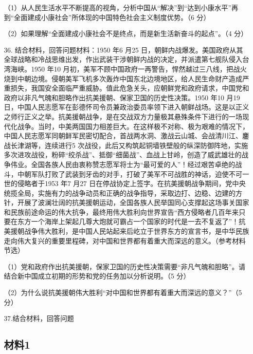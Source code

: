 \documentclass[UTF8,11pt]{ctexart}
\begin{document}
（1）从人民生活水平不断提高的视角，分析中国从“解决”到“达到小康水平”再到“全面建成小康社会”所体现的中国特色社会主义制度优势。（6 分）


（2）如果理解“全面建成小康社会不是终点，而是新生活新奋斗的起点”。（4 分）


36. 结合材料，回答问题材料：1950 年6 月25 日，朝鲜内战爆发。美国政府从其全球战略和冷战思维出发，作出武装干涉朝鲜内战的决定，并派遣第七舰队侵入台湾海峡。1950 年10 月初，美军不顾中国政府一再警告，悍然越过三八线，把战火烧到中朝边境。侵朝美军飞机多次轰炸中国东北边境地区，给人民生命财产造成严重损失，我国安全面临严重威胁。值此危急关头，应朝鲜党和政府请求，中国党和政府以非凡气魄和胆略作出抗美援朝、保家卫国的历史性决策。1950 年10 月19 日，中国人民志愿军在彭德怀司令员兼政治委员率领下进入朝鲜战场。这是以正义之师行正义之举。抗美援朝战争，是在交战双方力量极其悬殊条件下进行的一场现代化战争。当时，中美两国国力相差巨大。在这样极不对称、极为艰难的情况下，中国人民志愿军同朝鲜军民密切配合，首战两水洞、激战云山城、会战清川江、鏖战长津湖等，连续进行5 次战役，此后又构筑起铜墙铁壁般的纵深防御阵地，实施多次进攻战役，粉碎“绞杀战”、抵御“细菌战”、血战上甘岭，创造了威武雄壮的战争伟业。全国各族人民由衷称赞志愿军将士为“最可爱的人”！经过艰苦卓绝的战斗，中朝军队打败了武装到牙齿的对手，打破了美军不可战胜的神话，迫使不可一世的侵略者于1953 年7 月27 日在停战协定上签字。在抗美援朝战争期间，党中央统揽全局，实施有力的战争动员和正确的战争指导，采取边打、边稳、边建的方针，开展了波澜壮阔的抗美援朝运动，全国各族人民举国同心支撑起这场事关国家和民族前途命运的伟大抗争，最终用伟大胜利向世界宣告“西方侵略者几百年来只要在东方一个海岸上架起几尊大炮就可霸占一个国家的时代是一去不复返了”！抗美援朝战争伟大胜利，是中国人民站起来后屹立于世界东方的宣言书，是中华民族走向伟大复兴的重要里程碑，对中国和世界都有着重大而深远的意义。（参考材料节选）


（1）党和政府作出抗美援朝，保家卫国的历史性决策需要“非凡气魄和胆略”。请结合新中国成立初期的形势和党的任务加以分析说明。（5 分）


（2）为什么说抗美援朝伟大胜利“对中国和世界都有着重大而深远的意义？”（5 分）


37.结合材料，回答问题


\subsection*{材料1}
\end{document}
